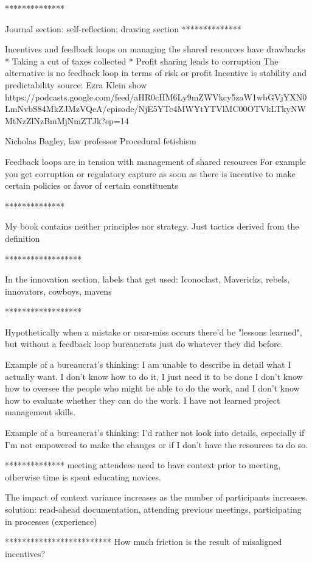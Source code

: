**************


Journal section: self-reflection; drawing section
**************

Incentives and feedback loops on managing the shared resources have drawbacks
* Taking a cut of taxes collected
* Profit sharing leads to corruption
The alternative is no feedback loop in terms of risk or profit
Incentive is stability and predictability
source:
Ezra Klein show
https://podcasts.google.com/feed/aHR0cHM6Ly9mZWVkcy5zaW1wbGVjYXN0LmNvbS84MkZJMzVQeA/episode/NjE5YTc4MWYtYTVlMC00OTVkLTkyNWMtNzZlNzBmMjNmZTJk?ep=14

Nicholas Bagley, law professor
Procedural fetishism

Feedback loops are in tension with management of shared resources
For example you get corruption or regulatory capture as soon as there is incentive to make certain policies or favor of certain constituents

**************

My book contains neither principles nor strategy. Just tactics derived from the definition

******************

In the innovation section, labels that get used:
Iconoclast, Mavericks, rebels, innovators, cowboys, mavens

******************

Hypothetically when a mistake or near-miss occurs there'd be "lessons learned", but without a feedback loop bureaucrats just do whatever they did before. 

Example of a bureaucrat's thinking:
I am unable to describe in detail what I actually want. I don't know how to do it, I just need it to be done I don't know how to oversee the people who might be able to do the work, and I don't know how to evaluate whether they can do the work. I have not learned project management skills.

Example of a bureaucrat's thinking:
I'd rather not look into details, especially if I'm not empowered to make the changes or if I don't have the resources to do so.

**************
meeting attendees need to have context prior to meeting, otherwise time is spent educating novices. 

The impact of context variance increases as the number of participants increases. solution: read-ahead documentation, attending previous meetings, participating in processes (experience)

*************************
How much friction is the result of misaligned incentives?

